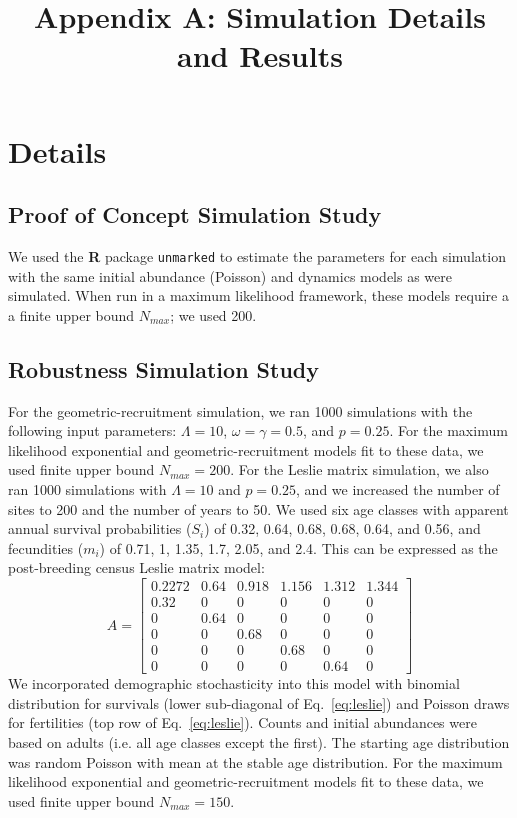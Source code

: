 \documentclass{article}
\begin{document}
\title{Appendix A: Simulation Details and Results}
\date{} %
\maketitle
\renewcommand*\thetable{A\arabic{table}}
\renewcommand*\thefigure{A\arabic{figure}}
\renewcommand*\theequation{A\arabic{equation}}

\section*{Details}
\subsection*{Proof of Concept Simulation Study}

We used the \textbf{R} package \texttt{unmarked} to estimate the parameters 
for each simulation with the same
initial abundance (Poisson) and dynamics models as were simulated.
When run in a maximum likelihood framework, these models require a
a finite upper bound $N_{max}$; we used 200.  

\subsection*{Robustness Simulation Study}
For the geometric-recruitment simulation, we ran 1000 simulations with the following input 
parameters: $\Lambda = 10$, $\omega = \gamma = 0.5$, and $p = 0.25$.  
For the maximum likelihood exponential and geometric-recruitment models fit to these data, 
we used finite upper bound $N_{max} = 200$. 
For the Leslie matrix simulation, we also ran 1000 simulations with $\Lambda = 10$ and $p = 0.25$,
and we increased the number of sites to 200 and the number of years to 50.  We used
six age classes with apparent annual survival probabilities ($S_{i}$) of 0.32, 0.64, 0.68, 0.68, 0.64, and 0.56,
and fecundities ($m_{i}$) of 0.71, 1, 1.35, 1.7, 2.05, and 2.4.  This can be expressed as the post-breeding
census Leslie matrix model:
\begin{equation}
A = \begin{bmatrix} 0.2272 & 0.64 & 0.918 & 1.156 & 1.312 & 1.344 \\ 
0.32 & 0 & 0 & 0 & 0 & 0 \\
0 & 0.64 & 0 & 0 & 0 & 0 \\
0 & 0 & 0.68 & 0 & 0 & 0 \\
0 & 0 & 0 & 0.68 & 0 & 0 \\
0 & 0 & 0 & 0 & 0.64 & 0 \end{bmatrix}
\label{eq:leslie}
\end{equation}
We incorporated demographic stochasticity into this model with binomial distribution for survivals
(lower sub-diagonal of Eq.~\ref{eq:leslie}) and Poisson draws for fertilities (top row of 
Eq.~\ref{eq:leslie}).  Counts and initial abundances were based on adults (i.e. all age classes except
the first).  The starting age distribution was random Poisson with mean at the stable age distribution.
For the maximum likelihood exponential and geometric-recruitment models fit to these data, 
we used finite upper bound $N_{max} = 150$. 
\end{document}
